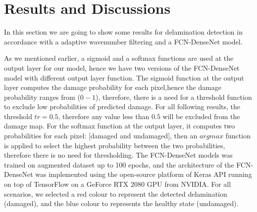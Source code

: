 \section{Results and Discussions}
	In this section we are going to show some results for delamination detection in accordance with a adaptive wavenumber filtering and a FCN-DenseNet model. 
	
	As we mentioned earlier, a sigmoid and a softmax functions are used at the output layer for our model, hence we have two versions of the FCN-DenseNet model with different output layer function.
	The sigmoid function at the output layer computes the damage probability for each pixel,hence the damage probability ranges from (\(0 - 1\)), therefore, there is a need for a threshold function to exclude low probabilities of predicted damage. 
	For all following results, the threshold \(tr = 0.5\), therefore any value less than \(0.5\) will be excluded from the damage map.
	For the softmax function at the output layer, it computes two probabilities for each pixel: [damaged and undamaged], then an \(argmax\) function is applied to select the highest probability between the two probabilities, therefore there is no need for thresholding. 
	The FCN-DenseNet models was trained on augmented dataset up to 100 epochs, and the architecture of the FCN-DenseNet  was implemented using the open-source platform of Keras API running on top of TensorFlow on a GeForce RTX 2080  GPU from NVIDIA.
	For all scenarios, we selected a red colour to represent the detected delamination (damaged), and the blue colour to represents the healthy state (undamaged).
	
